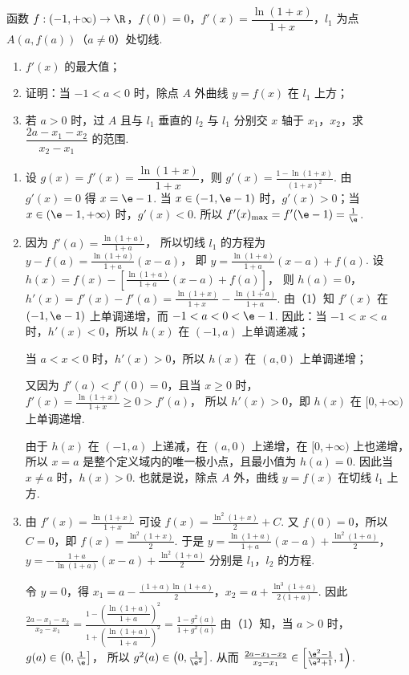 \documentclass[UTF8,a4paper,oneside,11pt]{ctexbook}
\begin{document}
\begin{problem}
函数 \(f:(-1,+\infty)\to\R\)，\(f(0)=0\)，\(f'(x)=\dfrac{\ln(1+x)}{1+x}\)，\(l_1\) 为点 \(A(a,f(a))\)（\(a\ne0\)）处切线.

\begin{enumerate}
    \item \(f'(x)\) 的最大值；
    \item 证明：当 \(-1<a<0\) 时，除点 \(A\) 外曲线 \(y=f(x)\) 在 \(l_1\) 上方；
    \item 若 \(a>0\) 时，过 \(A\) 且与 \(l_1\) 垂直的 \(l_2\) 与 \(l_1\) 分别交 \(x\) 轴于 \(x_1\)，\(x_2\)，求 \(\dfrac{2a-x_1-x_2}{x_2-x_1}\) 的范围.
\end{enumerate}
\end{problem}

\begin{solution}
\begin{enumerate}
\item 设 \(g(x)=f'(x)=\dfrac{\ln(1+x)}{1+x}\)，则
\(g'(x)=\frac{1-\ln(1+x)}{(1+x)^2}\).
由 \(g'(x)=0\) 得 \(x=\e-1\). 当 \(x\in(-1,\e-1)\) 时，\(g'(x)>0\)；当 \(x\in(\e-1,+\infty)\) 时，\(g'(x)<0\). 所以
\(f'(x)_{\max}=f'(\e-1)=\frac{1}{\e}\).

\item 因为
\(f'(a)=\frac{\ln(1+a)}{1+a}\)，
所以切线 \(l_1\) 的方程为
\(y-f(a)=\frac{\ln(1+a)}{1+a}(x-a)\)，
即
\(y=\frac{\ln(1+a)}{1+a}(x-a)+f(a)\).
设
\(h(x)=f(x)-\left[\frac{\ln(1+a)}{1+a}(x-a)+f(a)\right]\)，
则
\(h(a)=0\)，\(h'(x)=f'(x)-f'(a)=\frac{\ln(1+x)}{1+x}-\frac{\ln(1+a)}{1+a}\).
由（1）知 \(f'(x)\) 在 \((-1,\e-1)\) 上单调递增，而 \(-1<a<0<\e-1\). 因此：当 \(-1<x<a\) 时，\(h'(x)<0\)，所以 \(h(x)\) 在 \((-1,a)\) 上单调递减；

当 \(a<x<0\) 时，\(h'(x)>0\)，所以 \(h(x)\) 在 \((a,0)\) 上单调递增；

又因为 \(f'(a)<f'(0)=0\)，且当 \(x\ge 0\) 时，
\(f'(x)=\frac{\ln(1+x)}{1+x}\ge 0>f'(a)\)，
所以 \(h'(x)>0\)，即 \(h(x)\) 在 \([0,+\infty)\) 上单调递增.

由于 \(h(x)\) 在 \((-1,a)\) 上递减，在 \((a,0)\) 上递增，在 \([0,+\infty)\) 上也递增，所以 \(x=a\) 是整个定义域内的唯一极小点，且最小值为 \(h(a)=0\).
因此当 \(x\ne a\) 时，\(h(x)>0\). 也就是说，除点 \(A\) 外，曲线 \(y=f(x)\) 在切线 \(l_1\) 上方.

\item 由
\(f'(x)=\frac{\ln(1+x)}{1+x}\)
可设
\(f(x)=\frac{\ln^2(1+x)}{2}+C\).
又 \(f(0)=0\)，所以 \(C=0\)，即
\(f(x)=\frac{\ln^2(1+x)}{2}\).
于是
\(y=\frac{\ln(1+a)}{1+a}(x-a)+\frac{\ln^2(1+a)}{2}\)，
\(y=-\frac{1+a}{\ln(1+a)}(x-a)+\frac{\ln^2(1+a)}{2}\)
分别是 \(l_1\)，\(l_2\) 的方程.

令 \(y=0\)，得
\(x_1=a-\frac{(1+a)\ln(1+a)}{2}\)，\(x_2=a+\frac{\ln^3(1+a)}{2(1+a)}\).
因此
\(
\frac{2a-x_1-x_2}{x_2-x_1}
=\frac{1-\left(\dfrac{\ln(1+a)}{1+a}\right)^2}{1+\left(\dfrac{\ln(1+a)}{1+a}\right)^2}
=\frac{1-g^2(a)}{1+g^2(a)}
\)
由（1）知，当 \(a>0\) 时，
\(g(a)\in\left(0,\frac{1}{\e}\right]\)，
所以
\(g^2(a)\in\left(0,\frac{1}{\e^2}\right]\).
从而 \(\frac{2a-x_1-x_2}{x_2-x_1}\in\left[\frac{\e^2-1}{\e^2+1},1\right)\).
\end{enumerate}
\end{solution}
\end{document}
